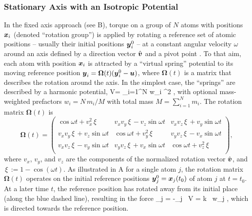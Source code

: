 \subsubsection{Stationary Axis with an Isotropic Potential}
In the fixed axis approach (see B), torque on a group of $N$
atoms with positions $\mbox{\boldmath ${x}$}_i$ (denoted ``rotation group'') is applied by
rotating a reference set of atomic positions -- usually their initial positions
$\mbox{\boldmath ${y}$}_i^0$ -- at a constant angular velocity $\omega$ around an axis
defined by a direction vector $\hat{\mbox{\boldmath ${v}$}}$ and a pivot point .
To that aim, each atom with position $\mbox{\boldmath ${x}$}_i$ is attracted by a
``virtual spring'' potential to its moving reference position
$\mbox{\boldmath ${y}$}_i = \mathbf{\Omega}(t) (\mbox{\boldmath ${y}$}_i^0 - \mbox{\boldmath ${u}$})$,
where $\mathbf{\Omega}(t)$ is a matrix that describes the rotation around the
axis. In the simplest case, the ``springs'' are described by a harmonic
potential,
\beq
V\rotiso =  \sum_{i=1}^{N} w_i ^2 ,
\label{eqn:potiso}
\eeq
with optional mass-weighted prefactors $w_i = N \, m_i/M$ with total mass
$M = \sum_{i=1}^N m_i$.
The rotation matrix $\mathbf{\Omega}(t)$ is 
\newcommand{\omcost}{\,\xi\,}   %
\begin{displaymath}
\mathbf{\Omega}(t) =  
\left(   
\begin{array}{ccc}
\cos\omega t + v_x^2\omcost       & v_x v_y\omcost - v_z\sin\omega t  & v_x v_z\omcost + v_y\sin\omega t\\
v_x v_y\omcost + v_z\sin\omega t  & \cos\omega t + v_y^2\omcost       & v_y v_z\omcost - v_x\sin\omega t\\
v_x v_z\omcost - v_y\sin\omega t  & v_y v_z\omcost + v_x\sin\omega t  & \cos\omega t + v_z^2\omcost     \\
\end{array}
\right) ,
\end{displaymath}
where $v_x$, $v_y$, and $v_z$ are the components of the normalized rotation vector
$\hat{\mbox{\boldmath ${v}$}}$, and $\omcost := 1-\cos(\omega t)$. As illustrated in
A for a single atom $j$, the
rotation matrix $\mathbf{\Omega}(t)$ operates on the initial reference positions
$\mbox{\boldmath ${y}$}_j^0 = \mbox{\boldmath ${x}$}_j(t_0)$ of atom $j$ at $t=t_0$. At a later
time $t$, the reference position has rotated away from its initial place
(along the blue dashed line), resulting in the force
\beq
{}_{\!j}\rotiso 
= -\nabla_{\!j} \, V\rotiso 
= k \, w_j  ,
\label{eqn:force_fixed}
\eeq
which is directed towards the reference position.


